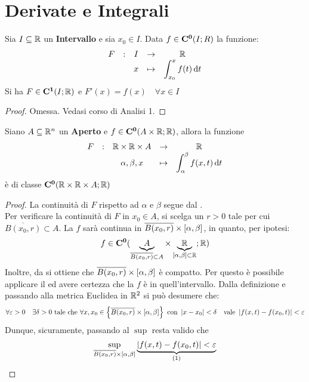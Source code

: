 \section{Derivate e Integrali}
\begin{theorem}
	\label{teo:fondament_calcolo_integ}
	Sia $I\subseteq \mathbb{R}$ un \textbf{Intervallo} e sia $x_0\in I$. Data $f\in \mathbf{C^{0}}(I;R)$ la funzione:
	\[\begin{array}{ccccc} {F} & : & {I} & \to & {\mathbb{R}} \\ & & {x} & \mapsto & {\displaystyle\int_{x_0}^{x}f(t)\,\mathrm{d}{t}} \\ \end{array}\]
	Si ha $F\in \mathbf{C^{1}}(I;\mathbb{R})$ e $F'(x)=f(x) \quad \forall x \in I$
	\begin{proof}
		Omessa. Vedasi corso di Analisi 1.
	\end{proof}
\end{theorem}
\begin{proposition}
	\label{prop:f_C0_allora_F_C0}
	Siano $A \subseteq \mathbb{R}^n$ un \textbf{Aperto} e $f \in \mathbf{C^{0}}(A \times \mathbb{R};\mathbb{R})$, allora la funzione
	\[\begin{array}{ccccc} {F} & : & {\mathbb{R} \times \mathbb{R} \times A} & \to & {\mathbb{R}} \\ & & {\alpha, \beta, x} & \mapsto & {\displaystyle\int_{\alpha}^{\beta} f(x,t)\,\mathrm{d}{t}} \\ \end{array}\]
	è di classe $\mathbf{C^{0}}(\mathbb{R} \times \mathbb{R} \times A;\mathbb{R})$
	\begin{proof}
		La continuità di $F$ rispetto ad $\alpha$ e $\beta$ segue dal .\\
		Per verificare la continuità di $F$ in $x_0 \in A$, si scelga un $r > 0$ tale per cui $\overline{B(x_0, r)} \subset A$. La $f$ sarà continua in $\overline{B(x_0, r)} \times \left[\alpha,\beta\right]$, in quanto, per ipotesi:
		\[f \in \mathbf{C^{0}}(\underbrace{A}_{\overline{B(x_0, r)} \subset A} \times \underbrace{\mathbb{R}}_{\left[\alpha,\beta\right] \subset \mathbb{R}};\mathbb{R})\]
		Inoltre, da  si ottiene che $\overline{B(x_0, r)} \times \left[\alpha,\beta\right]$ è compatto. Per questo è possibile applicare il  ed avere certezza che la $f$ è  in quell'intervallo. Dalla definizione e passando alla metrica Euclidea in $\mathbb{R}^2$ si può desumere che:
		\[\forall \varepsilon > 0 \quad \exists \delta > 0 \text{ tale che } \forall x,x_0 \in \left\{\overline{B(x_0, r)} \times \left[\alpha,\beta\right]\right\} \text{ con } \left|x - x_0\right| < \delta \quad \text{vale } \left|f(x, t) - f(x_0, t)\right| < \varepsilon\]
		Dunque, sicuramente, passando al $\sup$ resta valido che
		\begin{equation}
			\label{eq:deriv_integ_F_alfa_beta_C0}
			\sup\limits_{\overline{B(x_0, r)} \times \intervalclose{\alpha}{\beta}} \underbrace{\abs{f(x, t) - f(x_0, t)} < \varepsilon}_{\text{(1)}}

\end{equation}
\end{proof}
\end{proposition}
